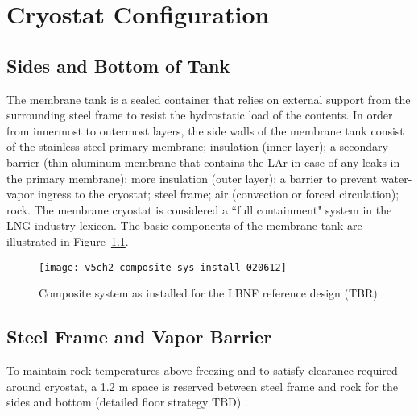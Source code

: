 
\chapter{Cryostat Configuration}
\label{Sec:cryo-cryosys-cryostat}

\section{Sides and Bottom of Tank}

The membrane tank is a sealed container that relies on external support 
from the surrounding steel frame to resist the hydrostatic load of the 
contents. In order from innermost to outermost layers, the side walls 
of the membrane tank consist of the stainless-steel primary membrane; 
insulation (inner layer); a secondary barrier (thin aluminum membrane that contains the LAr 
in case of any leaks in the primary membrane); more insulation (outer layer); a 
barrier to prevent water-vapor ingress to the cryostat; steel frame; 
air (convection or forced circulation); rock. The membrane cryostat 
is considered a ``full containment" system in the LNG industry lexicon. 
The basic components of the membrane tank are illustrated in 
Figure~\ref{fig:composite-sys-install}.


\begin{figure}[htbp]
\centering
\texttt{[image: v5ch2-composite-sys-install-020612]}
\caption{Composite system as installed for the LBNF reference design (TBR)} 
\label{fig:composite-sys-install}
\end{figure}



\section{Steel Frame and Vapor Barrier}
 To maintain rock temperatures above freezing and to satisfy clearance required around cryostat, a 1.2 m space is reserved between steel frame 
and rock for the sides and bottom (detailed floor strategy TBD)
. %

